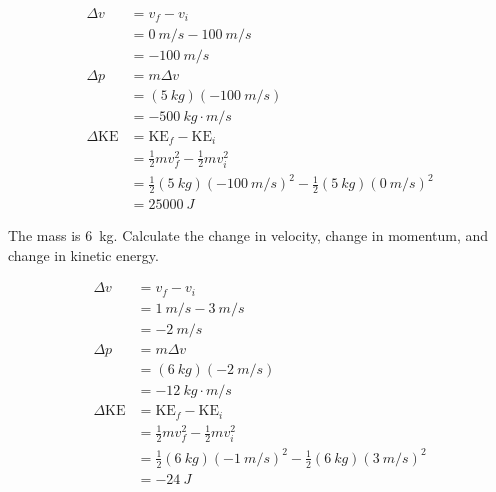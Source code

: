 \documentclass[../main-physics-problems.tex]{subfiles}
\begin{document}
\begin{questions}
\begin{solution}
\begin{align*}
    \Delta v &= v_f - v_i \\[1ex]
    &= \SI{0}{m/s} - \SI{100}{m/s} \\[1ex]
    &= \boxed{\SI{-100}{m/s}} \\[2ex]
    \Delta p &= m \Delta v \\[1ex]
    &= (\SI{5}{kg})(\SI{-100}{m/s}) \\[1ex]
    &= \boxed{\SI{-500}{kg\cdot m/s}} \\[2ex]
    \Delta \mathrm{KE} &= \mathrm{KE}_f - \mathrm{KE}_i \\[1ex]
    &= \frac{1}{2}m v_f^2 - \frac{1}{2}mv_i^2 \\[1ex]
    &= \frac{1}{2}(\SI{5}{kg})(\SI{-100}{m/s})^2 - \frac{1}{2}(\SI{5}{kg}) (\SI{0}{m/s})^2 \\[1ex]
    &= \boxed{\SI{25000}{J}}
\end{align*}
\end{solution}

\ifprintanswers
    \clearpage
\fi

\question
The mass is \SI{6}{kg}. Calculate the change in velocity, change in momentum, and change in kinetic energy. 

\begin{center}
\end{center}

\begin{solution}
\begin{align*}
    \Delta v &= v_f - v_i \\[1ex]
    &= \SI{1}{m/s} - \SI{3}{m/s} \\[1ex]
    &= \boxed{\SI{-2}{m/s}} \\[2ex]
    \Delta p &= m \Delta v \\[1ex]
    &= (\SI{6}{kg})(\SI{-2}{m/s}) \\[1ex]
    &= \boxed{\SI{-12}{kg\cdot m/s}} \\[2ex]
    \Delta \mathrm{KE} &= \mathrm{KE}_f - \mathrm{KE}_i \\[1ex]
    &= \frac{1}{2}m v_f^2 - \frac{1}{2}mv_i^2 \\[1ex]
    &= \frac{1}{2}(\SI{6}{kg})(\SI{-1}{m/s})^2 - \frac{1}{2}(\SI{6}{kg}) (\SI{3}{m/s})^2 \\[1ex]
    &= \boxed{\SI{-24}{J}}
\end{align*}
\end{solution}


\end{questions}
\end{document}
